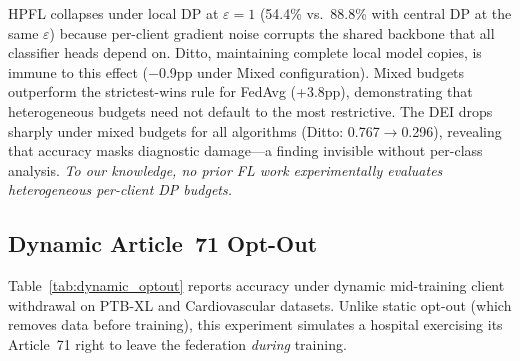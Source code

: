 \documentclass[conference,a4paper]{IEEEtran}
\begin{document}
\begin{table}[htbp]
\centering
\caption{Cross-border heterogeneous DP on PTB-XL (5 clients, 5-class ECG). Per-client local DP with Gaussian mechanism, $C{=}1.0$, $\delta{=}10^{-5}$. Mean $\pm$ std over 3 seeds.}
\label{tab:crossborder_dp}

\vspace{1mm}
\footnotesize{HPFL collapses under local DP at $\varepsilon{=}1$ (54.4\% vs.\ 88.8\% with central DP at the same $\varepsilon$) because per-client gradient noise corrupts the shared backbone that all classifier heads depend on. Ditto, maintaining complete local model copies, is immune to this effect ($-$0.9pp under Mixed configuration). Mixed budgets outperform the strictest-wins rule for FedAvg (+3.8pp), demonstrating that heterogeneous budgets need not default to the most restrictive. The DEI drops sharply under mixed budgets for all algorithms (Ditto: 0.767$\to$0.296), revealing that accuracy masks diagnostic damage---a finding invisible without per-class analysis. \textit{To our knowledge, no prior FL work experimentally evaluates heterogeneous per-client DP budgets.}}
\end{table}

\subsection{Dynamic Article~71 Opt-Out}
\label{sec:dynamic_optout}

Table~\ref{tab:dynamic_optout} reports accuracy under dynamic mid-training client withdrawal on PTB-XL and Cardiovascular datasets. Unlike static opt-out (which removes data before training), this experiment simulates a hospital exercising its Article~71 right to leave the federation \textit{during} training.
\end{document}
